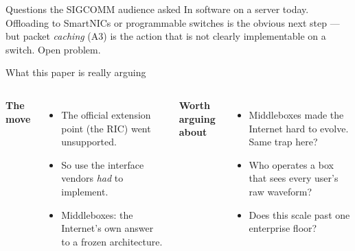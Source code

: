 \begin{frame}[t]{Questions the SIGCOMM audience asked}
  \vspace{0.5em}
     {In software on a server today. Offloading to SmartNICs or programmable
      switches is the obvious next step --- but packet \emph{caching} (A3) is the
      action that is not clearly implementable on a switch. Open problem.}

  \vspace{0.6em}
\end{frame}

\begin{frame}{What this paper is really arguing}
  \vspace{0.5em}
  \begin{columns}[T,onlytextwidth]
      {\small\textbf{\textcolor{ranblue}{The move}}\par}
      \vspace{0.3em}
      {\small
       \begin{itemize}\itemsep4pt
         \item The official extension point (the RIC) went unsupported.
         \item So use the interface vendors \emph{had} to implement.
         \item Middleboxes: the Internet's own answer to a frozen architecture.
       \end{itemize}\par}
      {\small\textbf{\textcolor{coreorange}{Worth arguing about}}\par}
      \vspace{0.3em}
      {\small
       \begin{itemize}\itemsep4pt
         \item Middleboxes made the Internet hard to evolve. Same trap here?
         \item Who operates a box that sees every user's raw waveform?
         \item Does this scale past one enterprise floor?
       \end{itemize}\par}
  \end{columns}

  \vspace{0.7em}
\end{frame}

